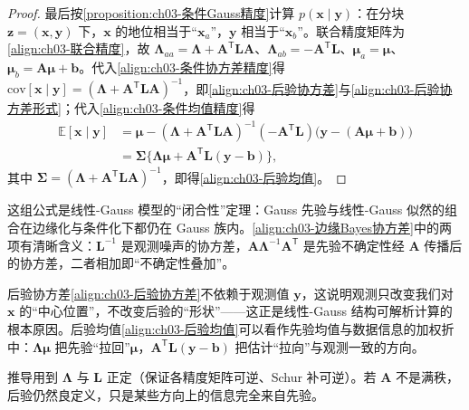 \documentclass[../../main.tex]{subfiles}
\begin{document}
\begin{proof}
最后按\cref{proposition:ch03-条件Gauss精度}计算 $p(\boldsymbol{x}\mid\boldsymbol{y})$：在分块 $\boldsymbol{z}=(\boldsymbol{x},\boldsymbol{y})$ 下，$\boldsymbol{x}$ 的地位相当于“$\boldsymbol{x}_a$”，$\boldsymbol{y}$ 相当于“$\boldsymbol{x}_b$”。联合精度矩阵为\eqref{align:ch03-联合精度}，故 $\boldsymbol{\Lambda}_{aa}=\boldsymbol{\Lambda}+\boldsymbol{A}^{\mathsf{T}}\boldsymbol{L}\boldsymbol{A}$、$\boldsymbol{\Lambda}_{ab}=-\boldsymbol{A}^{\mathsf{T}}\boldsymbol{L}$、$\boldsymbol{\mu}_{a}=\boldsymbol{\mu}$、$\boldsymbol{\mu}_{b}=\boldsymbol{A}\boldsymbol{\mu}+\boldsymbol{b}$。代入\eqref{align:ch03-条件协方差精度}得 $\mathrm{cov}[\boldsymbol{x}\mid\boldsymbol{y}]=(\boldsymbol{\Lambda}+\boldsymbol{A}^{\mathsf{T}}\boldsymbol{L}\boldsymbol{A})^{-1}$，即\eqref{align:ch03-后验协方差}与\eqref{align:ch03-后验协方差形式}；代入\eqref{align:ch03-条件均值精度}得
\begin{align*}
\mathbb{E}[\boldsymbol{x}\mid\boldsymbol{y}]&=\boldsymbol{\mu}-(\boldsymbol{\Lambda}+\boldsymbol{A}^{\mathsf{T}}\boldsymbol{L}\boldsymbol{A})^{-1}(-\boldsymbol{A}^{\mathsf{T}}\boldsymbol{L})\bigl(\boldsymbol{y}-(\boldsymbol{A}\boldsymbol{\mu}+\boldsymbol{b})\bigr)\\
&=\boldsymbol{\Sigma}\bigl\{\boldsymbol{\Lambda}\boldsymbol{\mu}+\boldsymbol{A}^{\mathsf{T}}\boldsymbol{L}(\boldsymbol{y}-\boldsymbol{b})\bigr\},
\end{align*}
其中 $\boldsymbol{\Sigma}=(\boldsymbol{\Lambda}+\boldsymbol{A}^{\mathsf{T}}\boldsymbol{L}\boldsymbol{A})^{-1}$，即得\eqref{align:ch03-后验均值}。
\end{proof}

\begin{remark}
这组公式是线性-Gauss 模型的“闭合性”定理：Gauss 先验与线性-Gauss 似然的组合在边缘化与条件化下都仍在 Gauss 族内。\eqref{align:ch03-边缘Bayes协方差}中的两项有清晰含义：$\boldsymbol{L}^{-1}$ 是观测噪声的协方差，$\boldsymbol{A}\boldsymbol{\Lambda}^{-1}\boldsymbol{A}^{\mathsf{T}}$ 是先验不确定性经 $\boldsymbol{A}$ 传播后的协方差，二者相加即“不确定性叠加”。

后验协方差\eqref{align:ch03-后验协方差}不依赖于观测值 $\boldsymbol{y}$，这说明观测只改变我们对 $\boldsymbol{x}$ 的“中心位置”，不改变后验的“形状”——这正是线性-Gauss 结构可解析计算的根本原因。后验均值\eqref{align:ch03-后验均值}可以看作先验均值与数据信息的加权折中：$\boldsymbol{\Lambda}\boldsymbol{\mu}$ 把先验“拉回”$\boldsymbol{\mu}$，$\boldsymbol{A}^{\mathsf{T}}\boldsymbol{L}(\boldsymbol{y}-\boldsymbol{b})$ 把估计“拉向”与观测一致的方向。

推导用到 $\boldsymbol{\Lambda}$ 与 $\boldsymbol{L}$ 正定（保证各精度矩阵可逆、Schur 补可逆）。若 $\boldsymbol{A}$ 不是满秩，后验仍然良定义，只是某些方向上的信息完全来自先验。
\end{remark}
\end{document}
